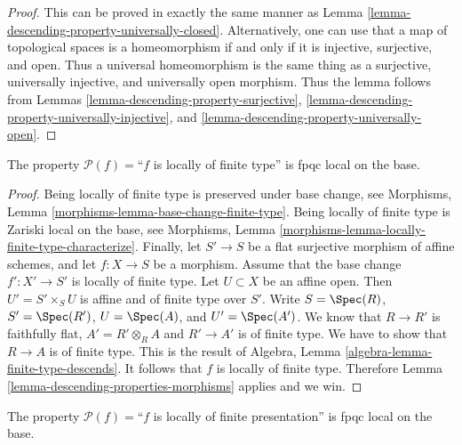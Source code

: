 \begin{proof}
This can be proved in exactly the same manner as
Lemma \ref{lemma-descending-property-universally-closed}.
Alternatively, one can use that
a map of topological spaces is a homeomorphism if and only if
it is injective, surjective, and open. Thus
a universal homeomorphism is the same thing as a
surjective, universally injective, and universally open morphism.
Thus the lemma follows from
Lemmas \ref{lemma-descending-property-surjective},
\ref{lemma-descending-property-universally-injective}, and
\ref{lemma-descending-property-universally-open}.
\end{proof}

\begin{lemma}
\label{lemma-descending-property-locally-finite-type}
The property $\mathcal{P}(f) =$``$f$ is locally of finite type''
is fpqc local on the base.
\end{lemma}

\begin{proof}
Being locally of finite type is preserved under base change, see
Morphisms, Lemma \ref{morphisms-lemma-base-change-finite-type}.
Being locally of finite type is Zariski local on the base, see
Morphisms, Lemma \ref{morphisms-lemma-locally-finite-type-characterize}.
Finally, let
$S' \to S$ be a flat surjective morphism of affine schemes,
and let $f : X \to S$ be a morphism. Assume that the base change
$f' : X' \to S'$ is locally of finite type.
Let $U \subset X$ be an affine open. Then $U' = S' \times_S U$
is affine and of finite type over $S'$. Write
$S = \Spec(R)$,
$S' = \Spec(R')$,
$U = \Spec(A)$, and
$U' = \Spec(A')$.
We know that $R \to R'$ is faithfully flat,
$A' = R' \otimes_R A$ and $R' \to A'$ is of finite type.
We have to show that $R \to A$ is of finite type.
This is the result of
Algebra, Lemma \ref{algebra-lemma-finite-type-descends}.
It follows that $f$ is locally of finite type.
Therefore Lemma \ref{lemma-descending-properties-morphisms} applies and we win.
\end{proof}

\begin{lemma}
\label{lemma-descending-property-locally-finite-presentation}
The property $\mathcal{P}(f) =$``$f$ is locally of finite presentation''
is fpqc local on the base.
\end{lemma}

